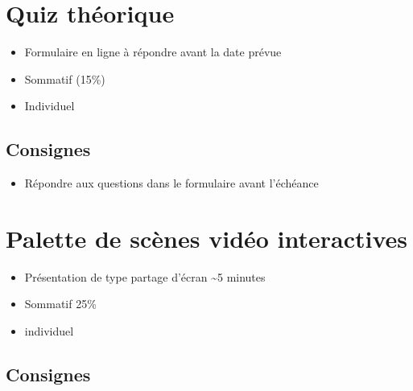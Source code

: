 \documentclass[
]{book}
\providecommand{\tightlist}{%
  \setlength{\itemsep}{0pt}\setlength{\parskip}{0pt}}
\begin{document}
\hypertarget{sommatif_3}{%
\section{Quiz théorique}\label{sommatif_3}}

\begin{itemize}
\tightlist
\item
  Formulaire en ligne à répondre avant la date prévue
\item
  Sommatif (15\%)
\item
  Individuel
\end{itemize}

\hypertarget{consignes-2}{%
\subsection{Consignes}\label{consignes-2}}

\begin{itemize}
\tightlist
\item
  Répondre aux questions dans le formulaire avant l'échéance
\end{itemize}

\hypertarget{sommatif_4}{%
\section{Palette de scènes vidéo interactives}\label{sommatif_4}}

\begin{itemize}
\tightlist
\item
  Présentation de type partage d'écran \textasciitilde5 minutes
\item
  Sommatif 25\%
\item
  individuel
\end{itemize}

\hypertarget{consignes-3}{%
\subsection{Consignes}\label{consignes-3}}
\end{document}
